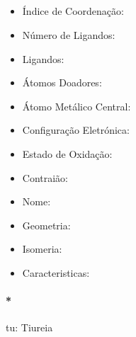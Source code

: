 \documentclass[12pt]{article}
\begin{document}
	\subsection{}
	\begin{itemize}
   
   \item Índice de Coordenação:
   
   \item Número de Ligandos:
   
   \item Ligandos:
   
   \item Átomos Doadores:
   
   \item Átomo Metálico Central:
   
   \item Configuração Eletrónica:
   
   \item Estado de Oxidação:
   
   \item Contraião:
   
   \item Nome:
   
   \item Geometria:
   
   \item Isomeria:

	\item Caracteristicas:

	\end{itemize}
	
\break


\paragraph{*}
tu: Tiureia 


	
\end{document}
